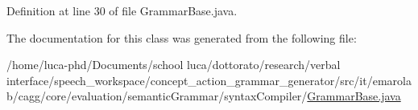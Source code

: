 Definition at line 30 of file Grammar\-Base.\-java.



The documentation for this class was generated from the following file\-:\begin{DoxyCompactItemize}
\item 
/home/luca-\/phd/\-Documents/school luca/dottorato/research/verbal interface/speech\-\_\-workspace/concept\-\_\-action\-\_\-grammar\-\_\-generator/src/it/emarolab/cagg/core/evaluation/semantic\-Grammar/syntax\-Compiler/\hyperlink{GrammarBase_8java}{Grammar\-Base.\-java}\end{DoxyCompactItemize}
